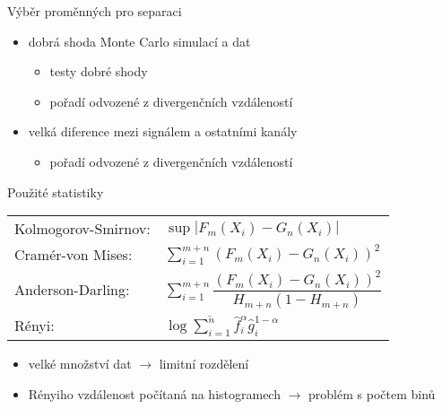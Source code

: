 \documentclass[11pt]{beamer}
\begin{document}
\begin{frame}
Výběr proměnných pro separaci
\begin{itemize}
\item dobrá shoda Monte Carlo simulací a dat
\begin{itemize}
\item testy dobré shody
\item pořadí odvozené z divergenčních vzdáleností
\end{itemize}
\item velká diference mezi signálem a ostatními kanály
\begin{itemize}
\item pořadí odvozené z divergenčních vzdáleností
\end{itemize}
\end{itemize}
\end{frame}

\begin{frame}{Použité statistiky}

\begin{tabular}{l l}
Kolmogorov-Smirnov: & $\sup |F_m(X_i) - G_n(X_i)|$ \vspace{0.1in}\\
Cramér-von Mises: & $ \sum_{i=1}^{m+n} \left( F_m\left(X_i\right) -
G_n\left(X_i\right)\right)^2$ \vspace{0.1in}\\

Anderson-Darling: & $\sum_{i=1}^{m+n} \dfrac{\left( F_m\left(X_i\right) -
G_n\left(X_i\right)\right)^2}{H_{m+n}\left( 1 - H_{m+n} \right)}$ \vspace{0.1in}\\
Rényi: & $\log \sum_{i=1}^{\tilde{n}} \hat{f}_i^\alpha \hat{g}_i^{1-\alpha}$ 
\end{tabular}

\pause
\begin{itemize}
	\item velké množství dat $\rightarrow$ limitní rozdělení
	\item Rényiho vzdálenost počítaná na histogramech $\rightarrow$ problém s počtem binů
\end{itemize}
\end{frame}
\end{document}
